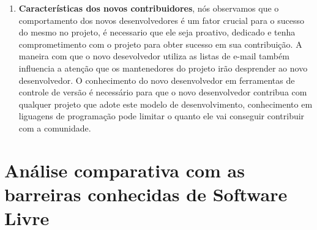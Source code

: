 \begin{enumerate}
\item \textbf{Características dos novos contribuidores}, nós observamos que o comportamento 
dos novos desenvolvedores é um fator crucial para o sucesso do mesmo no projeto, é necessario
que ele seja proativo, dedicado e tenha comprometimento com o projeto para obter sucesso
em sua contribuição. A maneira com que o novo desevolvedor utiliza as listas de e-mail
também influencia a atenção que os mantenedores do projeto irão desprender ao novo
desenvolvedor. O conhecimento do novo desenvolvedor em ferramentas de controle de versão
é necessário para que o novo desenvolvedor contribua com qualquer projeto que adote este
modelo de desenvolvimento, conhecimento em liguagens de programação pode limitar o quanto ele 
vai conseguir contribuir com a comunidade.

\end{enumerate}

\section{Análise comparativa com as barreiras conhecidas de Software Livre}



